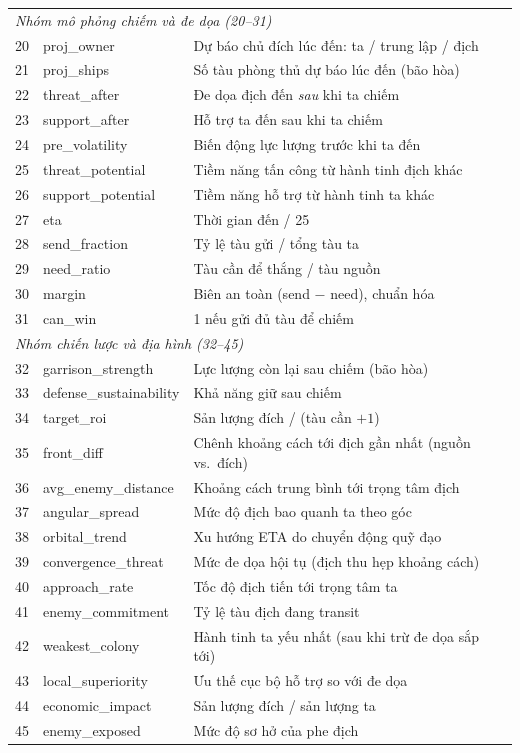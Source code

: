 \documentclass[conference]{IEEEtran}
\begin{document}
\begin{table}[htbp]
\begin{tabular}{clp{8.5cm}}
\midrule
\multicolumn{3}{l}{\textit{Nhóm mô phỏng chiếm và đe dọa (20--31)}} \\
20 & proj\_owner & Dự báo chủ đích lúc đến: ta / trung lập / địch \\
21 & proj\_ships & Số tàu phòng thủ dự báo lúc đến (bão hòa) \\
22 & threat\_after & Đe dọa địch đến \textit{sau} khi ta chiếm \\
23 & support\_after & Hỗ trợ ta đến sau khi ta chiếm \\
24 & pre\_volatility & Biến động lực lượng trước khi ta đến \\
25 & threat\_potential & Tiềm năng tấn công từ hành tinh địch khác \\
26 & support\_potential & Tiềm năng hỗ trợ từ hành tinh ta khác \\
27 & eta & Thời gian đến / 25 \\
28 & send\_fraction & Tỷ lệ tàu gửi / tổng tàu ta \\
29 & need\_ratio & Tàu cần để thắng / tàu nguồn \\
30 & margin & Biên an toàn (send $-$ need), chuẩn hóa \\
31 & can\_win & 1 nếu gửi đủ tàu để chiếm \\
\midrule
\multicolumn{3}{l}{\textit{Nhóm chiến lược và địa hình (32--45)}} \\
32 & garrison\_strength & Lực lượng còn lại sau chiếm (bão hòa) \\
33 & defense\_sustainability & Khả năng giữ sau chiếm \\
34 & target\_roi & Sản lượng đích / (tàu cần $+ 1$) \\
35 & front\_diff & Chênh khoảng cách tới địch gần nhất (nguồn vs.\ đích) \\
36 & avg\_enemy\_distance & Khoảng cách trung bình tới trọng tâm địch \\
37 & angular\_spread & Mức độ địch bao quanh ta theo góc \\
38 & orbital\_trend & Xu hướng ETA do chuyển động quỹ đạo \\
39 & convergence\_threat & Mức đe dọa hội tụ (địch thu hẹp khoảng cách) \\
40 & approach\_rate & Tốc độ địch tiến tới trọng tâm ta \\
41 & enemy\_commitment & Tỷ lệ tàu địch đang transit \\
42 & weakest\_colony & Hành tinh ta yếu nhất (sau khi trừ đe dọa sắp tới) \\
43 & local\_superiority & Ưu thế cục bộ hỗ trợ so với đe dọa \\
44 & economic\_impact & Sản lượng đích / sản lượng ta \\
45 & enemy\_exposed & Mức độ sơ hở của phe địch \\
\bottomrule
\end{tabular}
\end{table}
\end{document}
